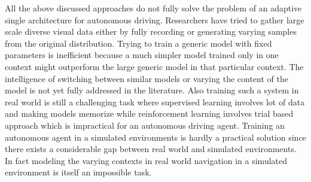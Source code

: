 All the above discussed approaches do not fully solve the problem of an adaptive single architecture for autonomous driving. Researchers have tried to gather large scale diverse visual data either by fully recording \cite{xu2016end} \cite{yu2018bdd100k} or generating varying samples from the original distribution. Trying to train a generic model with fixed parameters is inefficient because a much simpler model trained only in one context might outperform the large generic model in that particular context. The intelligence of switching between similar models or varying the content of the model is not yet fully addressed in the literature. Also training such a system in real world is still a challenging task where supervised learning involves lot of data and making models memorize while reinforcement learning involves trial based approach which is impractical for an autonomous driving agent. Training an autonomous agent in a simulated environments\cite{SantanaH16,abbeel2004apprenticeship,lillicrap2015continuous} is hardly a practical solution since there exists a considerable gap between real world and simulated environments. In fact modeling the varying contexts in real world navigation in a simulated environment is itself an impossible task.
